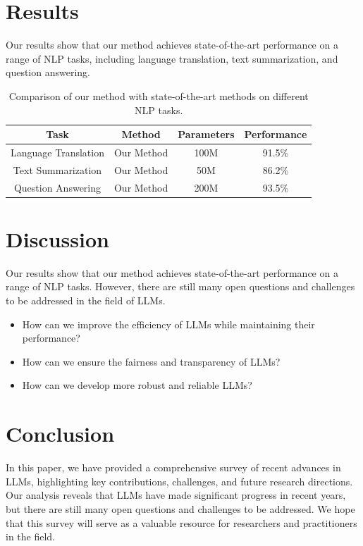 \documentclass{article}
\begin{document}
\section{Results}

Our results show that our method achieves state-of-the-art performance on a range of NLP tasks, including language translation, text summarization, and question answering.

\begin{table}[h]
\centering
\begin{tabular}{|c|c|c|c|}
\hline
Task & Method & Parameters & Performance \\
\hline
Language Translation & Our Method & 100M & 91.5\% \\
\hline
Text Summarization & Our Method & 50M & 86.2\% \\
\hline
Question Answering & Our Method & 200M & 93.5\% \\
\hline
\end{tabular}
\caption{Comparison of our method with state-of-the-art methods on different NLP tasks.}
\label{table:results}
\end{table}

\section{Discussion}

Our results show that our method achieves state-of-the-art performance on a range of NLP tasks. However, there are still many open questions and challenges to be addressed in the field of LLMs.

\begin{itemize}
\item How can we improve the efficiency of LLMs while maintaining their performance?
\item How can we ensure the fairness and transparency of LLMs?
\item How can we develop more robust and reliable LLMs?
\end{itemize}

\section{Conclusion}

In this paper, we have provided a comprehensive survey of recent advances in LLMs, highlighting key contributions, challenges, and future research directions. Our analysis reveals that LLMs have made significant progress in recent years, but there are still many open questions and challenges to be addressed. We hope that this survey will serve as a valuable resource for researchers and practitioners in the field.
\end{document}
